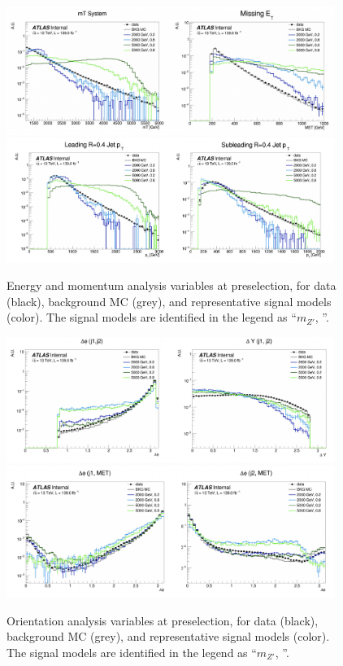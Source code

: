 \begin{figure}[!htbp]
\centering
    \includegraphics[width=0.95\textwidth]{figures/eventsel/preselection/presel1}
    \includegraphics[width=0.95\textwidth]{figures/eventsel/preselection/presel2}
    \caption{Energy and momentum analysis variables at preselection, for data (black), background MC (grey), and representative signal models (color). The signal models are identified in the legend as ``$m_{Z'}$, \rinv''. 
    \label{fig:presel_vars}}
\end{figure}

\begin{figure}[!htbp]
\centering
    \includegraphics[width=0.95\textwidth]{figures/eventsel/preselection/presel3}
    \includegraphics[width=0.95\textwidth]{figures/eventsel/preselection/presel4}
     \caption{Orientation analysis variables at preselection, for data (black), background MC (grey), and representative signal models (color). The signal models are identified in the legend as ``$m_{Z'}$, \rinv''. 
      \label{fig:presel_vars2}}
\end{figure}

